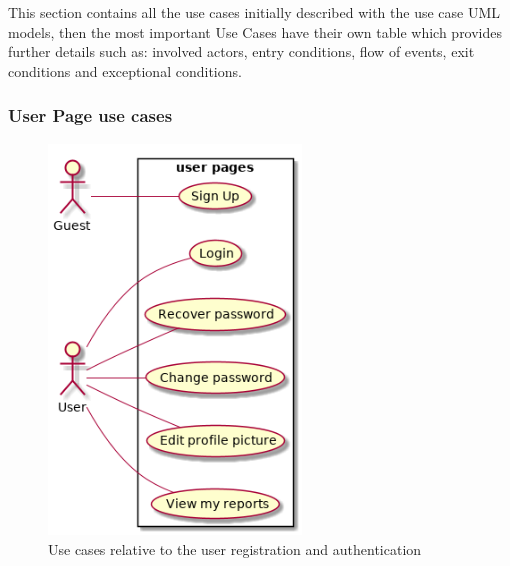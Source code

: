 \newcommand{\usecasefigure}[2]{
	\begin{figure}[htp]
		\centering
		\texttt{[image: images/useCases/\#1.png]}
		\caption{Use case diagram #2}
		\label{fig:use_cases_#1}
	\end{figure}
	\newpage
}

\newcommand{\usecasefiguresmall}[2]{
	\begin{figure}[htp]
		\centering
		\texttt{[image: images/useCases/\#1.png]}
		\caption{Use case diagram #2}
		\label{fig:use_cases_#1}
	\end{figure}
	\newpage
}

\newcommand{\usecasefiguresmaller}[2]{
	\begin{figure}[htp]
		\centering
		\texttt{[image: images/useCases/\#1.png]}
		\caption{Use case diagram #2}
		\label{fig:use_cases_#1}
	\end{figure}
	\newpage
}

This section contains all the use cases initially described with the use case UML models, then the most important Use Cases have their own table which provides further details such as: involved actors, entry conditions, flow of events,  exit conditions and exceptional conditions.

\subsubsection{User Page use cases}
\begin{figure}[htp]
	\centering
	\includegraphics[width=0.6\textwidth]{images/useCases/uc_user_page.png}
	\caption{Use cases relative to the user registration and authentication} 
	\label{fig:userpage} 
\end{figure} 

